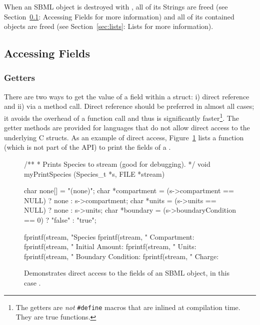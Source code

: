 \documentclass{cekmanual}
\begin{document}
When an SBML object is destroyed with , all of its
Strings are freed (see Section~\ref{sec:accessing-fields}: Accessing
Fields for more information) and all of its contained objects are
freed (see Section~\ref{sec:lists}: Lists for more information).


\subsection{Accessing Fields}
\label{sec:accessing-fields}


\subsubsection{Getters}

There are two ways to get the value of a field within a struct: i)
direct reference and ii) via a method call.  Direct reference should
be preferred in almost all cases; it avoids the overhead of a function
call and thus is significantly faster\footnote{The getters are
\emph{not} \texttt{\#define} macros that are inlined at compilation
time.  They are true functions.}.  The getter methods are provided for
languages that do not allow direct access to the underlying C structs.
As an example of direct access, Figure~\ref{fig:print-species} lists a
function (which is not part of the API) to print the fields of a
.


\begin{figure}[htb]
  \begin{codeVerbatim}[C,flexiblecolumns=false]
/**
 * Prints Species to stream (good for debugging).
 */
void
myPrintSpecies (Species_t *s, FILE *stream)
{
  char none[]       = "(none)";
  char *compartment = (s->compartment == NULL) ? none : s->compartment;
  char *units       = (s->units       == NULL) ? none : s->units;
  char *boundary    = (s->boundaryCondition == 0) ? "false" : "true";


  fprintf(stream, "Species %
  fprintf(stream, "         Compartment: %
  fprintf(stream, "      Initial Amount: %
  fprintf(stream, "               Units: %
  fprintf(stream, "  Boundary Condition: %
  fprintf(stream, "              Charge: %
}
  \end{codeVerbatim}
  \caption{Demonstrates direct access to the fields of an SBML object,
  in this case .}
  \label{fig:print-species}
\end{figure}
\end{document}
